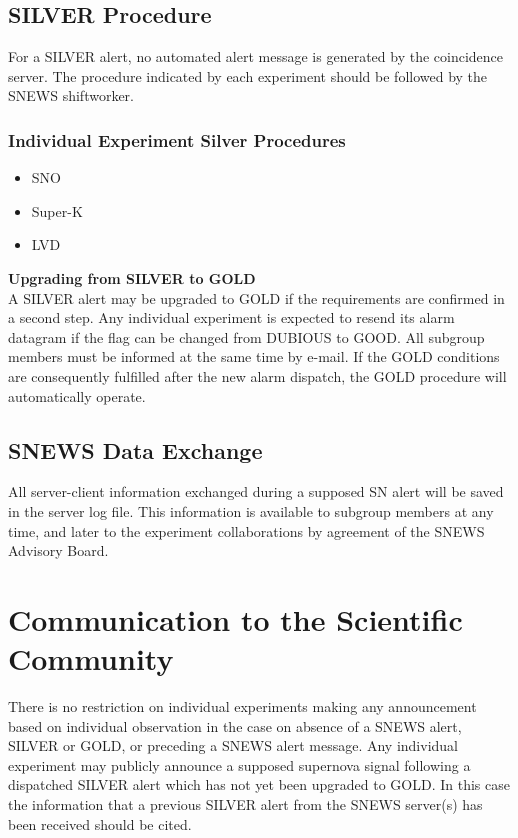 \documentclass{article}
\begin{document}
\subsection{SILVER Procedure}\label{SILVER}
For a SILVER alert, no automated alert message
is generated by the coincidence server. 
The procedure indicated by each experiment should be followed by
the SNEWS shiftworker.\\

\subsubsection{Individual Experiment Silver Procedures}

\begin{itemize}

\item SNO
\item Super-K
\item LVD

\end{itemize}


\noindent \textbf{Upgrading from SILVER to GOLD}\\
A SILVER alert may be upgraded to GOLD if the requirements are
confirmed in a second step. Any individual experiment is expected to
resend its alarm datagram if the flag can be changed from DUBIOUS to
GOOD. All subgroup members must be informed at the same time by
e-mail. If the GOLD conditions are consequently fulfilled after the
new alarm dispatch, the GOLD procedure will automatically operate.

\subsection{SNEWS Data Exchange}

All server-client information
exchanged during a supposed SN alert will be saved
in the server log file. This information is available to subgroup
members at any time, and later to the experiment collaborations
by agreement of the SNEWS Advisory Board.



\section{Communication to the Scientific Community}
There is no restriction on individual experiments making any announcement
based on individual observation in the case on absence of a SNEWS
alert, SILVER or GOLD, or preceding a SNEWS alert message.  
Any individual experiment may
publicly announce a supposed supernova signal following a dispatched 
SILVER alert which has not yet been upgraded to GOLD.  In this case 
the information that a previous SILVER alert from the
SNEWS server(s) has been received should be cited.
                                         
\end{document}
